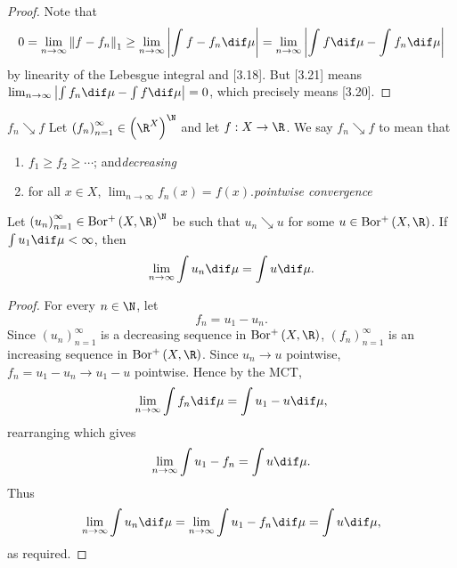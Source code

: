 \documentclass[pmath450]{subfiles}
\begin{document}
    \clearpage
    \begin{proof}
        Note that
        \begin{equation}
            0 = \lim_{n\to\infty} \left\lVert f-f_n \right\rVert_{1} \geq \lim_{n\to\infty}\left| \int^{}_{}f-f_n\dif\mu \right| = \lim_{n\to\infty}\left| \int^{}_{}f\dif\mu-\int^{}_{}f_n\dif\mu \right|
        \end{equation}
        by linearity of the Lebesgue integral and [3.18]. But [3.21] means $\lim_{n\to\infty}\left|\int f_n\dif\mu - \int f\dif\mu\right|=0$, which precisely means [3.20]. 
    \end{proof}

    \begin{notation}{$f_n\searrow f$}
        Let $\left( f_{n} \right)^{\infty}_{n=1}\in\left( \R^{X} \right)^{\N}$ and let $f:X\to\R$. We say $f_n\searrow f$ to mean that
        \begin{enumerate}
            \item $f_1\geq f_2\geq\cdots$; and\hfill\textit{decreasing}
            \item for all $x\in X$, $\lim_{n\to\infty}f_n\left( x \right)=f\left( x \right)$.\hfill\textit{pointwise convergence}
        \end{enumerate}
    \end{notation}

    \begin{prop}{}
        Let $\left( u_{n} \right)^{\infty}_{n=1}\in\borplus\left( X,\R \right)^{\N}$ be such that $u_n\searrow u$ for some $u\in\borplus\left( X,\R \right)$. If $\int u_1\dif\mu<\infty$, then
        \begin{equation*}
            \lim_{n\to\infty}\int u_n\dif\mu = \int u\dif\mu.
        \end{equation*}
    \end{prop}

    \begin{proof}
        For every $n\in\N$, let
        \begin{equation*}
            f_n = u_1 - u_n.
        \end{equation*}
        Since $\left( u_{n} \right)^{\infty}_{n=1}$ is a decreasing sequence in $\borplus\left( X,\R \right)$, $\left( f_{n} \right)^{\infty}_{n=1}$ is an increasing sequence in $\borplus\left( X,\R \right)$. Since $u_n\to u$ pointwise, $f_n=u_1-u_n\to u_1-u$ pointwise. Hence by the MCT,
        \begin{equation*}
            \lim_{n\to\infty}\int f_n\dif\mu = \int u_1-u\dif\mu,
        \end{equation*}
        rearranging which gives
        \begin{equation*}
            \lim_{n\to\infty}\int u_1-f_n = \int u\dif\mu.
        \end{equation*}
        Thus
        \begin{equation*}
            \lim_{n\to\infty} \int u_n\dif\mu = \lim_{n\to\infty}\int u_1-f_n\dif\mu = \int u\dif\mu,
        \end{equation*}
        as required.
    \end{proof}
\end{document}
